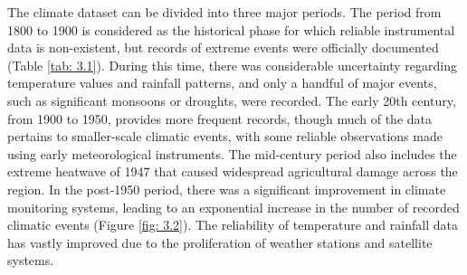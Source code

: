 The climate dataset can be divided into three major periods. The period from 1800 to 1900 is considered as the historical phase for which reliable instrumental data is non-existent, but records of extreme events were officially documented (Table \ref{tab: 3.1}). During this time, there was considerable uncertainty regarding temperature values and rainfall patterns, and only a handful of major events, such as significant monsoons or droughts, were recorded. The early 20th century, from 1900 to 1950, provides more frequent records, though much of the data pertains to smaller-scale climatic events, with some reliable observations made using early meteorological instruments. The mid-century period also includes the extreme heatwave of 1947 that caused widespread agricultural damage across the region. In the post-1950 period, there was a significant improvement in climate monitoring systems, leading to an exponential increase in the number of recorded climatic events (Figure \ref{fig: 3.2}). The reliability of temperature and rainfall data has vastly improved due to the proliferation of weather stations and satellite systems.

